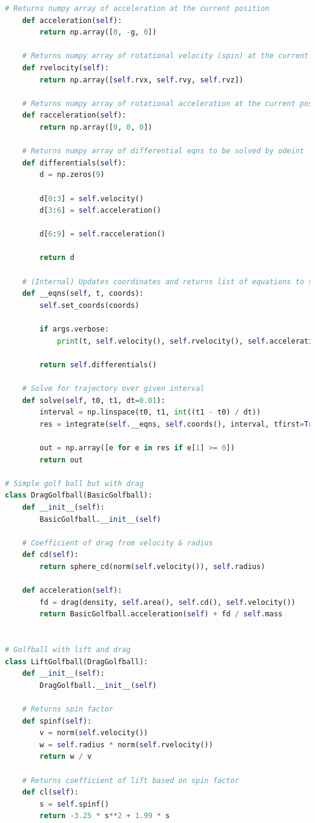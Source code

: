 \documentclass[12pt]{article}
\begin{document}
\begin{lstlisting}[language=Python, caption=Python model), style=PythonStyle, basicstyle=\tiny]
	# Returns numpy array of acceleration at the current position
	def acceleration(self):
		return np.array([0, -g, 0])

	# Returns numpy array of rotational velocity (spin) at the current position
	def rvelocity(self):
		return np.array([self.rvx, self.rvy, self.rvz])

	# Returns numpy array of rotational acceleration at the current position
	def racceleration(self):
		return np.array([0, 0, 0])

	# Returns numpy array of differential eqns to be solved by odeint
	def differentials(self):
		d = np.zeros(9)

		d[0:3] = self.velocity()
		d[3:6] = self.acceleration()

		d[6:9] = self.racceleration()

		return d

	# (Internal) Updates coordinates and returns list of equations to solve (for odeint)
	def __eqns(self, t, coords):
		self.set_coords(coords)

		if args.verbose:
			print(t, self.velocity(), self.rvelocity(), self.acceleration(), self.racceleration())

		return self.differentials()

	# Solve for trajectory over given interval
	def solve(self, t0, t1, dt=0.01):
		interval = np.linspace(t0, t1, int((t1 - t0) / dt))
		res = integrate(self.__eqns, self.coords(), interval, tfirst=True)[:, :3]

		out = np.array([e for e in res if e[1] >= 0])
		return out

# Simple golf ball but with drag
class DragGolfball(BasicGolfball):
	def __init__(self):
		BasicGolfball.__init__(self)

	# Coefficient of drag from velocity & radius
	def cd(self):
		return sphere_cd(norm(self.velocity()), self.radius)

	def acceleration(self):
		fd = drag(density, self.area(), self.cd(), self.velocity())
		return BasicGolfball.acceleration(self) + fd / self.mass


# Golfball with lift and drag
class LiftGolfball(DragGolfball):
	def __init__(self):
		DragGolfball.__init__(self)

	# Returns spin factor
	def spinf(self):
		v = norm(self.velocity())
		w = self.radius * norm(self.rvelocity())
		return w / v

	# Returns coefficient of lift based on spin factor
	def cl(self):
		s = self.spinf()
		return -3.25 * s**2 + 1.99 * s


\end{lstlisting}
\end{document}
